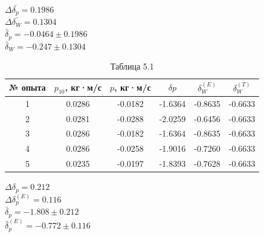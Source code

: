 \documentclass[12pt]{article}
\begin{document}
\begin{flushleft}
    $ \Delta \bar{\delta_p} = 0.1986 $ \\
    $ \Delta \bar{\delta_W} = 0.1304 $ \\
    $ \bar{\delta}_p = -0.0464 \pm0.1986 $ \\
    $ \bar{\delta}_W  = -0.247 \pm0.1304 $ \\

    \begin{table}[h]
        \centering
        \renewcommand{\arraystretch}{1.3}
        \setlength{\tabcolsep}{8pt}
        \captionsetup{justification=centering, font=bf}
        \caption{Таблица 5.1}
        \begin{tabular}{|c|c|c|c|c|c|}
            \hline
            № опыта & \( p_{10} \), кг·м/с & \( p \), кг·м/с & \( \delta p \) & \( \delta_W^{(E)} \) & \( \delta_W^{(T)} \) \\
            \hline
            1 & 0.0286 & -0.0182 & -1.6364 & -0.8635 & -0.6633 \\
            \hline
            2 & 0.0281 & -0.0288 & -2.0259 & -0.6456 & -0.6633 \\
            \hline
            3 & 0.0286 & -0.0182 & -1.6364 & -0.8635 & -0.6633 \\
            \hline
            4 & 0.0286 & -0.0258 & -1.9016 & -0.7260 & -0.6633 \\
            \hline
            5 & 0.0235 & -0.0197 & -1.8393 & -0.7628 & -0.6633 \\
            \hline
        \end{tabular}
    \end{table}

    $ \Delta \delta_p = 0.212 $ \\
    $ \Delta \delta_p^{(E)} = 0.116 $ \\
    $ \bar{\delta}_p = -1.808 \pm 0.212 $ \\
    $ \bar{\delta}_p^{(E)} = -0.772 \pm 0.116 $ \\
    

\end{flushleft}
\end{document}
